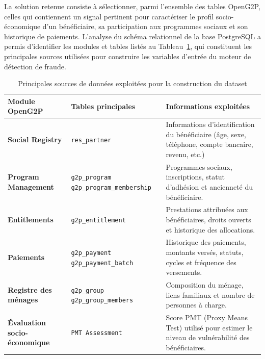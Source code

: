 \documentclass[a4paper, oneside, 12pt]{book}
\newcommand{\thead}[1]{\cellcolor{EYdark}\textcolor{white}{\textbf{#1}}}
\renewcommand{\thead}[1]{\cellcolor{EYyellow}\textcolor{EYdark}{\textbf{#1}}}
\begin{document}
\hspace{0.5cm}La solution retenue consiste à sélectionner, parmi l'ensemble des tables OpenG2P, celles qui contiennent un signal pertinent pour caractériser le profil socio-économique d'un bénéficiaire, sa participation aux programmes sociaux et son historique de paiements. L'analyse du schéma relationnel de la base PostgreSQL a permis d'identifier les modules et tables listés au Tableau~\ref{tab:data_sources}, qui constituent les principales sources utilisées pour construire les variables d'entrée du moteur de détection de fraude.

\begin{table}[H]
\centering
\caption{Principales sources de données exploitées pour la construction du dataset}
\label{tab:data_sources}
\renewcommand{\arraystretch}{1.3}
\begin{tabular}{>{\bfseries}p{4cm} p{4cm} p{7cm}}
\hline
\thead{Module OpenG2P} & \thead{Tables principales} & \thead{Informations exploitées} \\
\hline
\rowcolor{EYgray}
Social Registry &
\texttt{res\_partner} &
Informations d'identification du bénéficiaire (âge, sexe, téléphone, compte bancaire, revenu, etc.) \\

Program Management &
\texttt{g2p\_program} \newline
\texttt{g2p\_program\_membership} &
Programmes sociaux, inscriptions, statut d'adhésion et ancienneté du bénéficiaire. \\

\rowcolor{EYgray}
Entitlements &
\texttt{g2p\_entitlement} &
Prestations attribuées aux bénéficiaires, droits ouverts et historique des allocations. \\

Paiements &
\texttt{g2p\_payment} \newline
\texttt{g2p\_payment\_batch} &
Historique des paiements, montants versés, statuts, cycles et fréquence des versements. \\

\rowcolor{EYgray}
Registre des ménages &
\texttt{g2p\_group} \newline
\texttt{g2p\_group\_members} &
Composition du ménage, liens familiaux et nombre de personnes à charge. \\

Évaluation socio-économique &
\texttt{PMT Assessment} &
Score PMT (Proxy Means Test) utilisé pour estimer le niveau de vulnérabilité des bénéficiaires. \\
\hline
\end{tabular}
\end{table}
\end{document}
